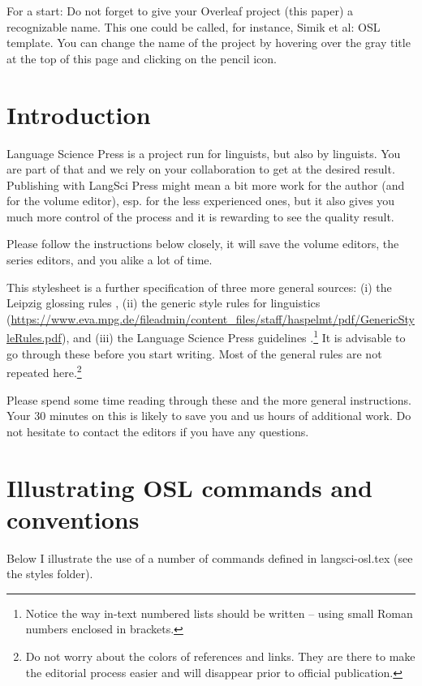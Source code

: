 For a start: Do not forget to give your Overleaf project (this paper) a recognizable name. This one could be called, for instance, Simik et al: OSL template. You can change the name of the project by hovering over the gray title at the top of this page and clicking on the pencil icon.

\section{Introduction}\label{sim:sec:intro}

Language Science Press is a project run for linguists, but also by linguists. You are part of that and we rely on your collaboration to get at the desired result. Publishing with LangSci Press might mean a bit more work for the author (and for the volume editor), esp. for the less experienced ones, but it also gives you much more control of the process and it is rewarding to see the quality result.

Please follow the instructions below closely, it will save the volume editors, the series editors, and you alike a lot of time.

\sloppy This stylesheet is a further specification of three more general sources: (i) the Leipzig glossing rules \citep{leipzig-glossing-rules}, (ii) the generic style rules for linguistics (\url{https://www.eva.mpg.de/fileadmin/content_files/staff/haspelmt/pdf/GenericStyleRules.pdf}), and (iii) the Language Science Press guidelines \citep{Nordhoff.Muller2021}.\footnote{Notice the way in-text numbered lists should be written -- using small Roman numbers enclosed in brackets.} It is advisable to go through these before you start writing. Most of the general rules are not repeated here.\footnote{Do not worry about the colors of references and links. They are there to make the editorial process easier and will disappear prior to official publication.}

Please spend some time reading through these and the more general instructions. Your 30 minutes on this is likely to save you and us hours of additional work. Do not hesitate to contact the editors if you have any questions.

\section{Illustrating OSL commands and conventions}\label{sim:sec:osl-comm}

Below I illustrate the use of a number of commands defined in langsci-osl.tex (see the styles folder).

